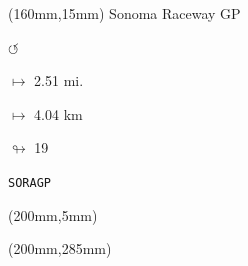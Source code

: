 \begin{textblock*}{40mm}(160mm,15mm)%
Sonoma Raceway GP
\par \Huge$\circlearrowleft$
\Large
\par$\mapsto$ 2.51 mi.
\par$\mapsto$ 4.04 km
\par$\looparrowright$ 19
\par\hfill\tiny\tt SORAGP\\
\end{textblock*}
\begin{textblock*}{20mm}(200mm,5mm)%
\fbox{\thepage}
\end{textblock*}
\begin{textblock*}{20mm}(200mm,285mm)%
\fbox{\thepage}
\end{textblock*}
\null\newpage


